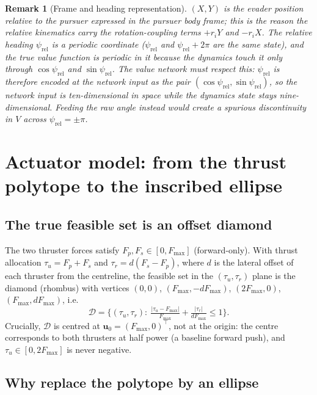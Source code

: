 \documentclass[11pt]{article}
\newtheorem{remark}{Remark}
\newcommand{\ubf}{\bm{u}}
\begin{document}
\begin{remark}[Frame and heading representation]
$(X,Y)$ is the evader position relative to the pursuer expressed in the \emph{pursuer body frame};
this is the reason the relative kinematics carry the rotation-coupling terms $+r_iY$ and $-r_iX$.
The relative heading $\psi_{\mathrm{rel}}$ is a \emph{periodic} coordinate ($\psi_{\mathrm{rel}}$
and $\psi_{\mathrm{rel}}+2\pi$ are the same state), and the true value function is periodic in it
because the dynamics touch it only through $\cos\psi_{\mathrm{rel}}$ and $\sin\psi_{\mathrm{rel}}$.
The value network must respect this: $\psi_{\mathrm{rel}}$ is therefore encoded at the network
input as the pair $(\cos\psi_{\mathrm{rel}},\sin\psi_{\mathrm{rel}})$, so the network input is
ten-dimensional in space while the dynamics state stays nine-dimensional. Feeding the raw angle
instead would create a spurious discontinuity in $V$ across $\psi_{\mathrm{rel}}=\pm\pi$.
\end{remark}

\section{Actuator model: from the thrust polytope to the inscribed ellipse}\label{sec:ellipse}

\subsection{The true feasible set is an offset diamond}

The two thruster forces satisfy $F_p,F_s\in[0,F_{\max}]$ (forward-only). With thrust allocation
$\tau_u=F_p+F_s$ and $\tau_r=d(F_s-F_p)$, where $d$ is the lateral offset of each thruster from
the centreline, the feasible set in the $(\tau_u,\tau_r)$ plane is the diamond (rhombus) with
vertices $(0,0)$, $(F_{\max},-dF_{\max})$, $(2F_{\max},0)$, $(F_{\max},dF_{\max})$, i.e.
\begin{equation}\label{eq:diamond}
\mathcal{D}=\Big\{(\tau_u,\tau_r):\ \tfrac{|\tau_u-F_{\max}|}{F_{\max}}+\tfrac{|\tau_r|}{dF_{\max}}\le 1\Big\}.
\end{equation}
Crucially, $\mathcal{D}$ is centred at $\ubf_0=(F_{\max},0)^\top$, not at the origin: the centre
corresponds to both thrusters at half power (a baseline forward push), and $\tau_u\in[0,2F_{\max}]$
is never negative.

\subsection{Why replace the polytope by an ellipse}
\end{document}

